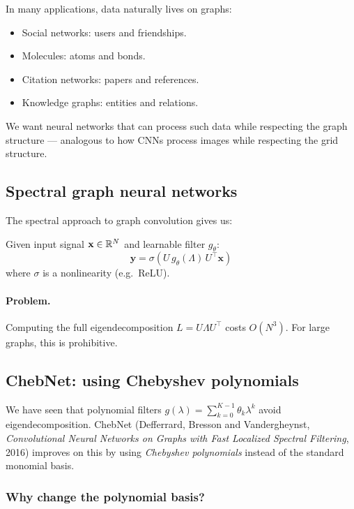 \begin{notechapter}
In many applications, data naturally lives on graphs:
\begin{itemize}
\item Social networks: users and friendships.
\item Molecules: atoms and bonds.
\item Citation networks: papers and references.
\item Knowledge graphs: entities and relations.
\end{itemize}

We want neural networks that can process such data while respecting
the graph structure --- analogous to how CNNs process images while
respecting the grid structure.

\subsection{Spectral graph neural networks}

The spectral approach to graph convolution gives us:

\begin{definition}
Given input signal $\mathbf{x} \in \mathbb{R}^N$ and learnable filter
$g_\theta$:
\begin{equation}
\mathbf{y} = \sigma\left( U \, g_\theta(\Lambda) \, U^\top \mathbf{x}
             \right)
\end{equation}
where $\sigma$ is a nonlinearity (e.g.\ ReLU).
\end{definition}

\paragraph{Problem.} Computing the full eigendecomposition
$L = U\Lambda U^\top$ costs $O(N^3)$. For large graphs, this is
prohibitive.

\subsection{ChebNet: using Chebyshev polynomials}

We have seen that polynomial filters $g(\lambda) = \sum_{k=0}^{K-1}
\theta_k \lambda^k$ avoid eigendecomposition. ChebNet (Defferrard, Bresson and Vandergheynst, \emph{Convolutional Neural Networks on Graphs with Fast Localized Spectral Filtering}, 2016) improves on this
by using \emph{Chebyshev polynomials} instead of the standard monomial
basis.

\subsubsection{Why change the polynomial basis?}


\end{notechapter}

